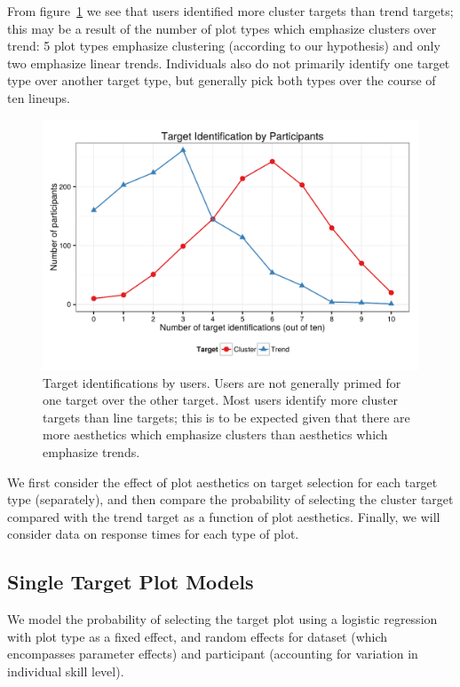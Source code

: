 \documentclass[11pt]{isuthesis}\usepackage[]{graphicx}\usepackage[]{color}
\newenvironment{knitrout}{}{} %
\begin{document}
From figure~\ref{fig:targets} we see that users identified more cluster targets than trend targets; this may be a result of the number of plot types which emphasize clusters over trend: 5 plot types emphasize clustering (according to our hypothesis) and only two emphasize linear trends. Individuals also do not primarily identify one target type over another target type, but generally pick both types over the course of ten lineups. 

\begin{figure}[ht]
\centering
\begin{knitrout}
\color{fgcolor}

{\centering \includegraphics[width=0.6\linewidth]{Figure/FeatureHierarchy/fig-targets-1} 

}



\end{knitrout}
\caption[Target identifications by users]{\label{fig:targets}Target identifications by users. Users are not generally primed for one target over the other target. Most users identify more cluster targets than line targets; this is to be expected given that there are more aesthetics which emphasize clusters than aesthetics which emphasize trends.}
\end{figure}

We  first consider the effect of plot aesthetics on target selection for each target type (separately), and then compare the probability of selecting the cluster target compared with the trend target as a function of plot aesthetics. Finally, we will consider data on response times for each type of plot.

\subsection{Single Target Plot Models}

We  model the probability of selecting the target plot using a logistic regression with plot type as a fixed effect, and random effects for dataset (which encompasses parameter effects) and participant (accounting for variation in individual skill level). 
\end{document}
